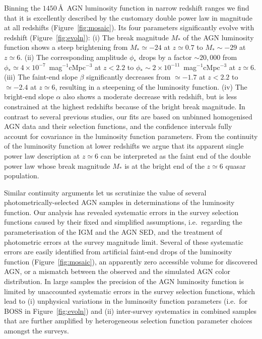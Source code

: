 \documentclass[fleqn,usenatbib]{mnras}
\begin{document}
Binning the $1450$\,\AA\ AGN luminosity function in narrow redshift ranges we find that it is
excellently described by the customary double power law in magnitude at all redshifts (Figure~\ref{fig:mosaic}).
Its four parameters significantly evolve with redshift (Figure~\ref{fig:evoln}):
(i) The break magnitude $M_*$ of the AGN luminosity function shows a steep brightening from $M_*\simeq -24$ at $z\simeq 0.7$ to $M_*\sim -29$ at $z\simeq 6$.
(ii) The corresponding amplitude $\phi_*$ drops by a factor $\sim 20,000$ from $\phi_*\simeq 4\times 10^{-7}$~mag$^{-1}$cMpc$^{-3}$ at $z<2.2$ to $\phi_*\sim 2\times 10^{-11}$~mag$^{-1}$cMpc$^{-3}$ at $z\simeq 6$.
(iii) The faint-end slope $\beta$ significantly decreases from $\simeq -1.7$ at $z<2.2$ to $\simeq -2.4$ at $z\simeq 6$, resulting in a steepening of the luminosity function.
(iv) The bright-end slope $\alpha$ also shows a moderate decrease with redshift, but is less constrained at the highest redshifts because of the bright break magnitude.
In contrast to several previous studies, our fits are based on unbinned homogenised AGN data
and their selection functions, and the confidence intervals fully account for covariance in the luminosity function parameters. 
From the continuity of the luminosity function at lower redshifts we argue that its apparent
single power law description at $z\simeq 6$ can be interpreted as the faint end of the double power law
whose break magnitude $M_*$ is at the bright end of the $z\simeq 6$ quasar population.

Similar continuity arguments let us scrutinize the value of several
photometrically-selected AGN samples in determinations of the
luminosity function.  Our analysis has revealed systematic errors in
the survey selection functions caused by their fixed and simplified
assumptions, i.e.\ regarding the parameterisation of the IGM and the
AGN SED, and the treatment of photometric errors at the survey
magnitude limit.  Several of these systematic errors are easily
identified from artificial faint-end drops of the luminosity function
(Figure~\ref{fig:mosaic}), an apparently zero accessible volume for
discovered AGN, or a mismatch between the observed and the simulated
AGN color distribution.  In large samples the precision of the AGN
luminosity function is limited by unaccounted systematic errors in the
survey selection functions, which lead to (i) unphysical variations in
the luminosity function parameters (i.e.\ for BOSS in
Figure~\ref{fig:evoln}) and (ii) inter-survey systematics in combined
samples that are further amplified by heterogeneous selection function
parameter choices amongst the surveys.
\end{document}
